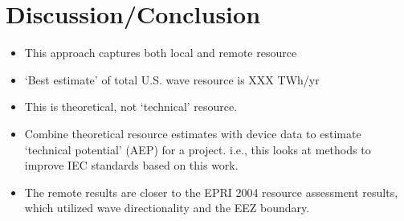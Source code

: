 
\section{Discussion/Conclusion}

\begin{itemize}
\item This approach captures both local and remote resource
\item ‘Best estimate’ of total U.S. wave resource is XXX TWh/yr
\item This is theoretical, not ‘technical’ resource.
\item Combine theoretical resource estimates with device data to estimate ‘technical potential’ (AEP) for a project. i.e., this looks at methods to improve IEC standards based on this work.
\item The remote results are closer to the EPRI 2004 resource assessment results, which utilized wave directionality and the EEZ boundary.
\end{itemize}


